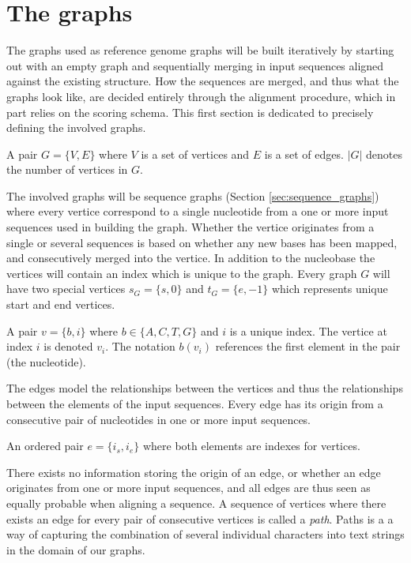 \documentclass[thesis.tex]{subfiles}
\begin{document}
{\section{The graphs}
The graphs used as reference genome graphs will be built iteratively by starting out with an empty graph and sequentially merging in input sequences aligned against the existing structure. How the sequences are merged, and thus what the graphs look like, are decided entirely through the alignment procedure, which in part relies on the scoring schema. This first section is dedicated to precisely defining the involved graphs. 
\begin{defn}
  A pair $G=\{V,E\}$ where $V$ is a set of vertices and $E$ is a set of edges. $|G|$ denotes the number of vertices in $G$.
\end{defn}
The involved graphs will be sequence graphs (Section \ref{sec:sequence_graphs}) where every vertice correspond to a single nucleotide from a one or more input sequences used in building the graph. Whether the vertice originates from a single or several sequences is based on whether any new bases has been mapped, and consecutively merged into the vertice. In addition to the nucleobase the vertices will contain an index which is unique to the graph. Every graph $G$ will have two special vertices $s_G=\{s, 0\}$ and $t_G=\{e, -1\}$ which represents unique start and end vertices. 
\begin{defn}
  A pair $v=\{b, i\}$ where $b \in \{A, C, T, G\}$ and $i$ is a unique index. The vertice at index $i$ is denoted $v_i$. The notation $b(v_i)$ references the first element in the pair (the nucleotide).
\end{defn}
The edges model the relationships between the vertices and thus the relationships between the elements of the input sequences. Every edge has its origin from a consecutive pair of nucleotides in one or more input sequences.
\begin{defn}
  An ordered pair $e=\{i_s, i_e\}$ where both elements are indexes for vertices. 
\end{defn}
There exists no information storing the origin of an edge, or whether an edge originates from one or more input sequences, and all edges are thus seen as equally probable when aligning a sequence. A sequence of vertices where there exists an edge for every pair of consecutive vertices is called a \textit{path}. Paths is a a way of capturing the combination of several individual characters into text strings in the domain of our graphs.
}
\end{document}
